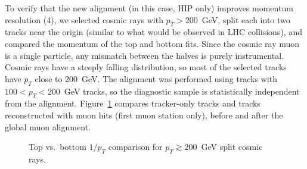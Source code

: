 To verify that the new alignment (in this case, HIP only) improves
momentum resolution (4), we selected cosmic rays with $p_T > 200$~GeV,
split each into two tracks near the origin (similar to what would be
observed in LHC collisions), and compared the momentum of the top and
bottom fits.  Since the cosmic ray muon is a single particle, any
mismatch between the halves is purely instrumental.  Cosmic rays have
a steeply falling distribution, so most of the selected tracks have
$p_T$ close to 200~GeV.  The alignment was performed using tracks with
$100 < p_T < 200$~GeV tracks, so the diagnostic sample is
statistically independent from the alignment.
Figure~\ref{fig:chargesplitting} compares tracker-only tracks and
tracks reconstructed with muon hits (first muon station only), before
and after the global muon alignment.

\begin{figure}
  \centering
  \caption{Top vs.~bottom $1/p_T$ comparison for $p_T \gtrsim 200$~GeV split cosmic rays.\label{fig:chargesplitting}}
\end{figure}
